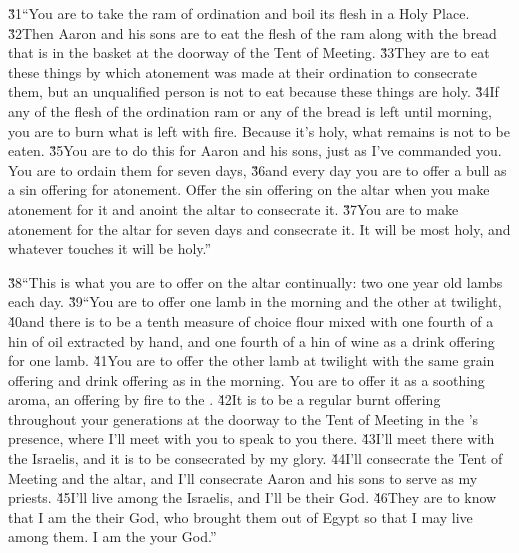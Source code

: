 \v{31}``You are to take the ram of ordination and boil its flesh in a Holy Place. \v{32}Then Aaron and his sons are to eat the flesh of the ram along with the bread that is in the basket at the doorway of the Tent of Meeting. \v{33}They are to eat these things by which atonement was made at their ordination to consecrate them, but an unqualified person is not to eat because these things are holy. \v{34}If any of the flesh of the ordination ram or any of the bread is left until morning, you are to burn what is left with fire. Because it's holy, what remains is not to be eaten. \v{35}You are to do this for Aaron and his sons, just as I've commanded you. You are to ordain them for seven days, \v{36}and every day you are to offer a bull as a sin offering for atonement. Offer the sin offering on the altar when you make atonement for it and anoint the altar to consecrate it. \v{37}You are to make atonement for the altar for seven days and consecrate it. It will be most holy, and whatever touches it will be holy.''

\v{38}``This is what you are to offer on the altar continually: two one year old lambs each day. \v{39}``You are to offer one lamb in the morning and the other at twilight, \v{40}and there is to be a tenth measure of choice flour mixed with one fourth of a hin of oil extracted by hand, and one fourth of a hin of wine as a drink offering for one lamb. \v{41}You are to offer the other lamb at twilight with the same grain offering and drink offering as in the morning. You are to offer it as a soothing aroma, an offering by fire to the . \v{42}It is to be a regular burnt offering throughout your generations at the doorway to the Tent of Meeting in the 's presence, where I'll meet with you to speak to you there. \v{43}I'll meet there with the Israelis, and it is to be consecrated by my glory. \v{44}I'll consecrate the Tent of Meeting and the altar, and I'll consecrate Aaron and his sons to serve as my priests. \v{45}I'll live among the Israelis, and I'll be their God. \v{46}They are to know that I am the  their God, who brought them out of Egypt so that I may live among them. I am the  your God.''

